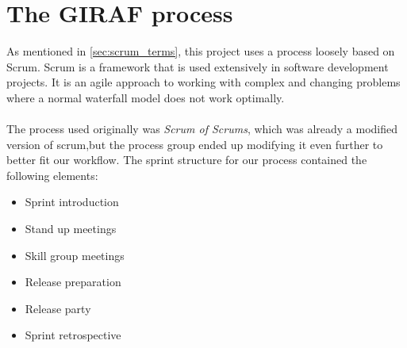 \section{The GIRAF process}\label{the-giraf-process}
As mentioned in \autoref{sec:scrum_terms}, this project uses a process loosely based on Scrum. Scrum is a framework that is used extensively in software development projects.
It is an agile approach to working with complex and changing problems where a normal waterfall model does not work optimally.
\\\\
The process used originally was \textit{Scrum of Scrums}, which was already a modified version of scrum,but the process group ended up modifying it even further to better fit our workflow.
The sprint structure for our process contained the following elements:

\begin{itemize}
    \item Sprint introduction
    \item Stand up meetings
    \item Skill group meetings
    \item Release preparation
    \item Release party
    \item Sprint retrospective
\end{itemize}

